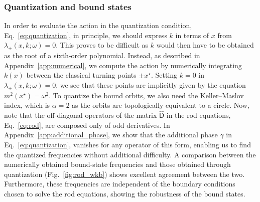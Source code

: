 \subsubsection*{Quantization and bound states}

In order to evaluate the action in the quantization condition, Eq.~\eqref{eq:quantization}, in principle, we should express $k$ in terms of $x$ from $\lambda_{+}(x, k; \omega) = 0$.
This proves to be difficult as $k$ would then have to be obtained as the root of a sixth-order polynomial.
Instead, as described in Appendix~\ref{app:numerical}, we compute the action by numerically integrating $k(x)$ between the classical turning points $\pm x^{\star}$.
Setting $k = 0$ in $\lambda_{+}(x, k; \omega) = 0$, we see that these points are implicitly given by the equation $m^{2}(x^{\star}) = \omega^{2}$.
To quantize the bound orbits, we also need the Keller--Maslov index, which is $\alpha = 2$ as the orbits are topologically equivalent to a circle.
Now, note that the off-diagonal operators of the matrix $\widehat{\mathsf{D}}$ in the rod equations, Eq.~\eqref{eq:rod}, are composed only of odd derivatives.
In Appendix~\ref{app:additional_phase}, we show that the additional phase $\gamma$ in Eq.~\eqref{eq:quantization}, vanishes for any operator of this form, enabling us to find the quantized frequencies without additional difficulty.
A comparison between the numerically obtained bound-state frequencies and those obtained through quantization (Fig.~\ref{fig:rod_wkb}) shows excellent agreement between the two.
Furthermore, these frequencies are independent of the boundary conditions chosen to solve the rod equations, showing the robustness of the bound states.

